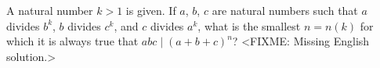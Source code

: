 \problem
A natural number $k > 1$ is given.
If $a$, $b$, $c$ are natural numbers such that $a$ divides $b^k$, $b$ divides
$c^k$, and $c$ divides $a^k$, what is the smallest $n = n(k)$ for which it is
always true that $a b c \mid (a + b + c)^n$?
\solution
<FIXME: Missing English solution.>
\endproblem
